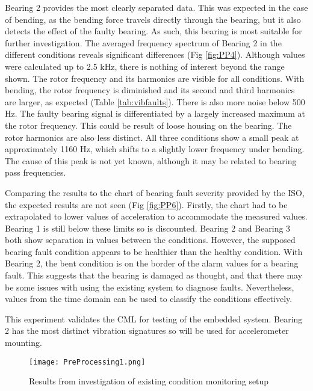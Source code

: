 Bearing 2 provides the most clearly separated data.
This was expected in the case of bending, as the bending force travels directly through the bearing, but it also detects the effect of the faulty bearing. 
As such, this bearing is most suitable for further investigation.
The averaged frequency spectrum of Bearing 2 in the different conditions reveals significant differences (Fig \ref{fig:PP4}).
Although values were calculated up to 2.5 kHz, there is nothing of interest beyond the range shown.
The rotor frequency and its harmonics are visible for all conditions.
With bending, the rotor frequency is diminished and its second and third harmonics are larger, as expected (Table \ref{tab:vibfaults}).
There is also more noise below 500 Hz.
The faulty bearing signal is differentiated by a largely increased maximum at the rotor frequency.
This could be result of loose housing on the bearing.
The rotor harmonics are also less distinct.
All three conditions show a small peak at approximately 1160 Hz, which shifts to a slightly lower frequency under bending. The cause of this peak is not yet known, although it may be related to bearing pass frequencies.
\par

Comparing the results to the chart of bearing fault severity provided by the ISO, the expected results are not seen (Fig \ref{fig:PP6}).
Firstly, the chart had to be extrapolated to lower values of acceleration to accommodate the measured values.
Bearing 1 is still below these limits so is discounted.
Bearing 2 and Bearing 3 both show separation in values between the conditions.
However, the supposed bearing fault condition appears to be healthier than the healthy condition.
With Bearing 2, the bent condition is on the border of the alarm values for a bearing fault.
This suggests that the bearing is damaged as thought, and that there may be some issues with using the existing system to diagnose faults.
Nevertheless, values from the time domain can be used to classify the conditions effectively.
\par

This experiment validates the CML for testing of the embedded system.
Bearing 2 has the most distinct vibration signatures so will be used for accelerometer mounting.


\begin{figure}
    \centering
    \texttt{[image: PreProcessing1.png]}
    \caption{Results from investigation of existing condition monitoring setup}
    \label{fig:PP1}
\end{figure}

